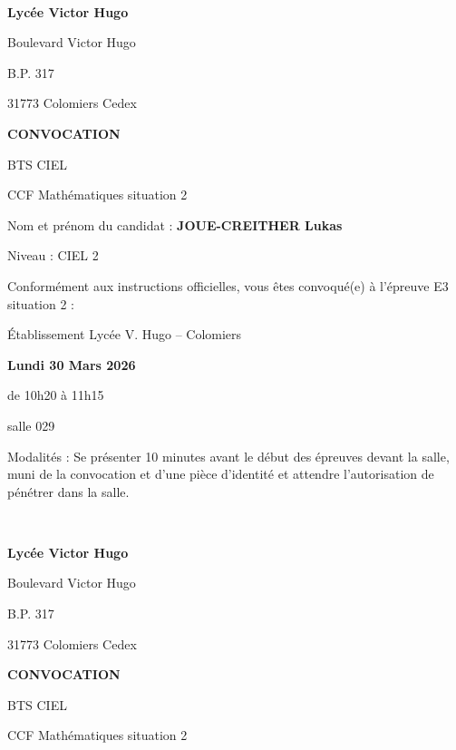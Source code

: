 \vfill

\vfill ~

\newpage

\begin{minipage}{0.3\lw}
\small\bf Lycée Victor Hugo

Boulevard Victor Hugo

B.P. 317

31773 Colomiers Cedex\sautp ~
\end{minipage}
\hfill
\begin{minipage}{0.65\lw}
\begin{center}
\Large \bf CONVOCATION\sautm

BTS CIEL\sautm

CCF Mathématiques situation 2
\end{center}
\end{minipage}

\vfill

Nom et prénom du candidat : {\large \bf JOUE-CREITHER Lukas}\sautp

Niveau : CIEL 2

\vfill

Conformément aux instructions officielles, vous êtes convoqué(e) à l’épreuve E3 situation 2 :\sautp

\begin{center}
Établissement Lycée V. Hugo -- Colomiers \sautp

\large \bf Lundi 30 Mars 2026\sautb

de 10h20 à 11h15\sautb

salle 029
\end{center}

\vfill 

Modalités : Se présenter 10 minutes avant le début des épreuves devant la salle, muni
de la convocation et d’une pièce d’identité et attendre l’autorisation de pénétrer dans la
salle.

\vfill

\vfill ~

\newpage

\begin{minipage}{0.3\lw}
\small\bf Lycée Victor Hugo

Boulevard Victor Hugo

B.P. 317

31773 Colomiers Cedex\sautp ~
\end{minipage}
\hfill
\begin{minipage}{0.65\lw}
\begin{center}
\Large \bf CONVOCATION\sautm

BTS CIEL\sautm

CCF Mathématiques situation 2
\end{center}
\end{minipage}

